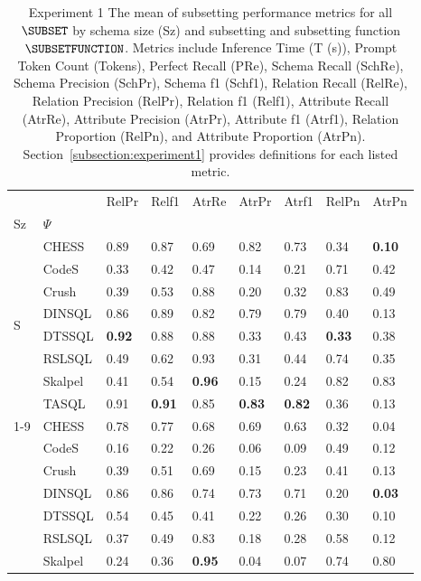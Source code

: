 \begin{table}
\caption{Experiment 1 The mean of subsetting performance metrics for all $\SUBSET$ by schema size (Sz) and subsetting and subsetting 
function $\SUBSETFUNCTION$. Metrics include Inference Time (T (s)), Prompt Token Count (Tokens), Perfect Recall (PRe), 
Schema Recall (SchRe), Schema Precision (SchPr), Schema f1 (Schf1), Relation Recall (RelRe), Relation Precision (RelPr),
Relation f1 (Relf1), Attribute Recall (AtrRe), Attribute Precision (AtrPr), Attribute f1 (Atrf1), Relation Proportion (RelPn), 
and Attribute Proportion (AtrPn). Section~\ref{subsection:experiment1} provides definitions for each listed metric.}
\label{tab:exp1-all-size-schema}
\begin{tabular}{lllllllll}
\toprule
 &  & RelPr & Relf1 & AtrRe & AtrPr & Atrf1 & RelPn & AtrPn \\
Sz & $\Psi$ &  &  &  &  &  &  &  \\
\midrule
\multirow[t]{8}{*}{S} & CHESS & 0.89 & 0.87 & 0.69 & 0.82 & 0.73 & 0.34 & \textbf{0.10} \\
 & CodeS & 0.33 & 0.42 & 0.47 & 0.14 & 0.21 & 0.71 & 0.42 \\
 & Crush & 0.39 & 0.53 & 0.88 & 0.20 & 0.32 & 0.83 & 0.49 \\
 & DINSQL & 0.86 & 0.89 & 0.82 & 0.79 & 0.79 & 0.40 & 0.13 \\
 & DTSSQL & \textbf{0.92} & 0.88 & 0.88 & 0.33 & 0.43 & \textbf{0.33} & 0.38 \\
 & RSLSQL & 0.49 & 0.62 & 0.93 & 0.31 & 0.44 & 0.74 & 0.35 \\
 & Skalpel & 0.41 & 0.54 & \textbf{0.96} & 0.15 & 0.24 & 0.82 & 0.83 \\
 & TASQL & 0.91 & \textbf{0.91} & 0.85 & \textbf{0.83} & \textbf{0.82} & 0.36 & 0.13 \\
\cline{1-9}
\multirow[t]{8}{*}{M} & CHESS & 0.78 & 0.77 & 0.68 & 0.69 & 0.63 & 0.32 & 0.04 \\
 & CodeS & 0.16 & 0.22 & 0.26 & 0.06 & 0.09 & 0.49 & 0.12 \\
 & Crush & 0.39 & 0.51 & 0.69 & 0.15 & 0.23 & 0.41 & 0.13 \\
 & DINSQL & 0.86 & 0.86 & 0.74 & 0.73 & 0.71 & 0.20 & \textbf{0.03} \\
 & DTSSQL & 0.54 & 0.45 & 0.41 & 0.22 & 0.26 & 0.30 & 0.10 \\
 & RSLSQL & 0.37 & 0.49 & 0.83 & 0.18 & 0.28 & 0.58 & 0.12 \\
 & Skalpel & 0.24 & 0.36 & \textbf{0.95} & 0.04 & 0.07 & 0.74 & 0.80 \\

\end{tabular}
\end{table}
